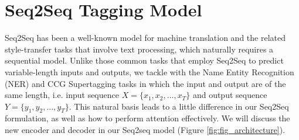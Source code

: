 \documentclass[11pt,a4paper]{article}
\begin{document}



\section{Seq2Seq Tagging Model} \label{ssec:model}

Seq2Seq \cite{seq2seq_2014} has been a well-known model for machine translation and the related style-transfer tasks that involve text processing, which naturally requires a sequential model. Unlike those common tasks that employ Seq2Seq to predict variable-length inputs and outputs, we tackle with the Name Entity Recognition (NER) and CCG Supertagging tasks in which the input and output are of the same length, i.e. input sequence $X=\{ x_1, x_2, ..., x_T\}$ and output sequence $Y=\{ y_1, y_2, ..., y_T\}$. This natural basis leads to a little difference in our Seq2Seq formulation, as well as how to perform attention effectively. We will discuss the new encoder and decoder in our Seq2seq model (Figure \ref{fig:fig_architecture}).



\end{document}
